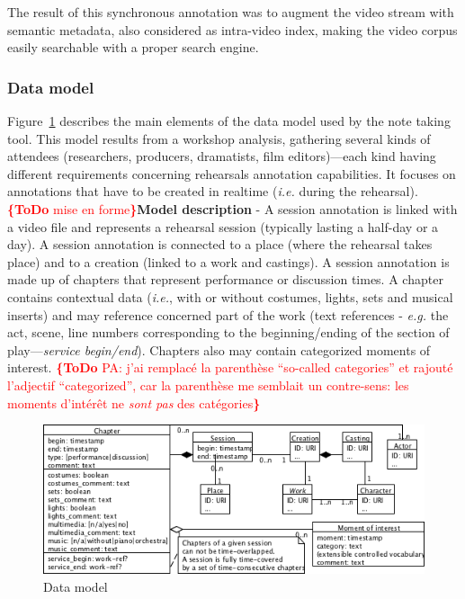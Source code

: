 \documentclass[conference]{IEEEtran}
\newcommand{\todo}[1]{\noindent\textcolor{red}{{\bf \{ToDo} #1{\bf \}}}}
\begin{document}
The result of this synchronous annotation was to augment the video stream with semantic metadata, also considered as intra-video index, making the video corpus easily searchable with a proper search engine.

\subsubsection{Data model} Figure~\ref{fig_data_model} describes the main elements of the data model used by the note taking tool. This model results from a workshop analysis, gathering several kinds of attendees (researchers, producers, dramatists, film editors)---each kind having different requirements concerning rehearsals annotation capabilities. It focuses on annotations that have to be created in realtime (\emph{i.e.} during the rehearsal). \newline
\todo{mise en forme}\textbf{Model description} - A session annotation is linked with a video file and represents a rehearsal session (typically lasting a half-day or a day). A session annotation is connected to a place (where the rehearsal takes place) and to a creation (linked to a work and castings). A session annotation is made up of chapters that represent performance or discussion times. A chapter contains contextual data (\emph{i.e.}, with or without costumes, lights, sets and musical inserts) and may reference concerned part of the work (text references - \emph{e.g.} the act, scene, line numbers corresponding to the beginning/ending of the section of play---\textit{service begin/end}). Chapters also may contain categorized moments of interest. \todo{PA: j'ai remplacé la parenthèse ``so-called categories'' et rajouté l'adjectif ``categorized'', car la parenthèse me semblait un contre-sens: les moments d'intérêt ne \emph{sont pas} des catégories}
\begin{figure}[ht]
\centering
\includegraphics[width=\columnwidth]{UMLet_Data_model}
\caption{Data model}
\label{fig_data_model}
\end{figure}
\end{document}
